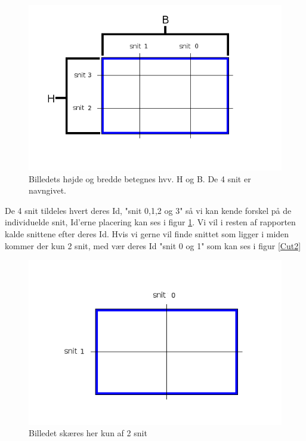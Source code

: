 \begin{figure}[h]
	\begin{center}
		\includegraphics[scale=0.42,angle=0]{afsnit/vores_implementation/billeder/naiv_algoritme/Cut}
	\end{center}
	\caption[]{Billedets højde og bredde betegnes hvv. H og B. De 4 snit er navngivet.}
	\label{cut}
\end{figure}

De 4 snit tildeles hvert deres Id, "snit 0,1,2 og 3" så vi kan kende
forskel på de individuelde snit, Id'erne placering kan ses i figur
\ref{cut}. Vi vil i resten af rapporten kalde snittene efter deres Id.
Hvis vi gerne vil finde snittet som ligger i miden kommer der kun 2
snit, med vær deres Id "snit 0 og 1" som kan ses i figur \ref{Cut2}

\begin{figure}[h]
	\begin{center}
		\includegraphics[scale=0.42,angle=0]{afsnit/vores_implementation/billeder/naiv_algoritme/2Cut}
	\end{center}
	\caption[]{Billedet skæres her kun af 2 snit}
	\label{2Cut}
\end{figure}


